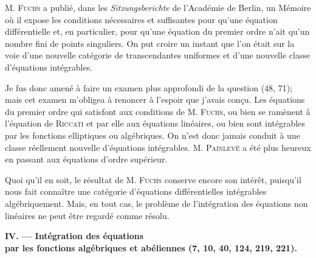 \documentclass[11pt]{article}
\begin{document}
M. \textsc{Fuchs} a publié, dans les \emph{Sitzungsberichte} de l’Académie de Berlin, un Mémoire où il expose les conditions nécessaires et suffisantes pour qu’une équation différentielle et, en particulier, pour qu’une équation du premier ordre n’ait qu’un nombre fini de points singuliers. On put croire un instant que l’on était sur la voie d’une nouvelle catégorie de transcendantes uniformes et d’une nouvelle classe d’équations intégrables.

Je fus donc amené à faire un examen plus approfondi de la question (48, 71); mais cet examen m’obligea à renoncer à l’espoir que j’avais conçu. Les équations du premier ordre qui satisfont aux conditions de M. \textsc{Fuchs}, ou bien se ramènent à l’équation de \textsc{Riccati} et par elle aux équations linéaires, ou bien sont intégrables par les fonctions elliptiques ou algébriques. On n’est donc jamais conduit à une classe réellement nouvelle d’équations intégrables. M. \textsc{Painlevé} a été plus heureux en passant aux équations d’ordre supérieur.

Quoi qu’il en soit, le résultat de M. \textsc{Fuchs} conserve encore son intérêt, puisqu’il nous fait connaître une catégorie d’équations différentielles intégrables algébriquement. Mais, en tout cas, le problème de l’intégration des équations non linéaires ne peut être regardé comme résolu.

\begin{center}
\textbf{IV. — Intégration des équations\\
par les fonctions algébriques et abéliennes (7, 10, 40, 124, 219, 221).}
\end{center}
\end{document}
